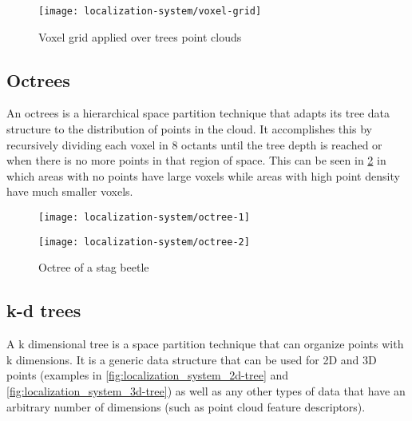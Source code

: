 \begin{figure}[H]
	\centering
	\texttt{[image: localization-system/voxel-grid]}
	\caption[Voxel grid applied over trees point clouds]{Voxel grid applied over trees point clouds \cite{Wu2013}}
	\label{fig:localization_system_voxel-grid}
\end{figure}



\subsection{Octrees}

An octrees is a hierarchical space partition technique that adapts its tree data structure to the distribution of points in the cloud. It accomplishes this by recursively dividing each voxel in 8 octants until the tree depth is reached or when there is no more points in that region of space. This can be seen in \cref{fig:localization_system_octree} in which areas with no points have large voxels while areas with high point density have much smaller voxels.

\begin{figure}[H]
	\centering
	\begin{minipage}[h]{.495\textwidth}
		\centering
		\texttt{[image: localization-system/octree-1]}
	\end{minipage}\hfill
	\begin{minipage}[h]{.495\textwidth}
		\centering
		\texttt{[image: localization-system/octree-2]}
	\end{minipage}
	\caption[Octree of a stag beetle]{Octree of a stag beetle\protect\footnotemark}
	\label{fig:localization_system_octree}
\end{figure}



\subsection{k-d trees}

A k dimensional tree is a space partition technique that can organize points with k dimensions. It is a generic data structure that can be used for 2D and 3D points (examples in \cref{fig:localization_system_2d-tree} and \cref{fig:localization_system_3d-tree}) as well as any other types of data that have an arbitrary number of dimensions (such as point cloud feature descriptors).

